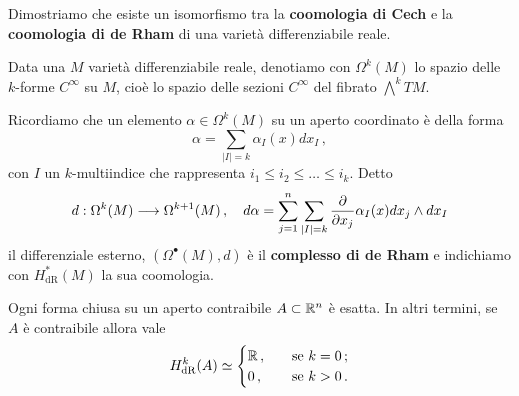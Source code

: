 \begin{ex}
	Dimostriamo che esiste un isomorfismo tra la \textbf{coomologia
	di Cech} e la \textbf{coomologia di de Rham}
	di una varietà differenziabile reale.
	
	\begin{df}
		Data una $M$ varietà differenziabile reale,
		denotiamo con $\Omega^{k}(M)$ lo spazio delle $k$-forme
		$C^{\infty}$ su $M$, cioè lo spazio delle sezioni $C^{\infty}$
		del fibrato $\bigwedge^{k} TM$.
	\end{df}
	
	Ricordiamo che un elemento
		$\alpha \in \Omega^{k}(M)$ su un aperto coordinato
		è della forma
		\begin{equation*}
			\alpha = \sum_{|I| = k} \alpha_{I}(x) dx_{I}\,,
		\end{equation*}
		con $I$ un $k$-multiindice che rappresenta $i_{1} \le i_{2} \le \dots \le i_{k}$.
		Detto 
		\begin{equation*}
			d : \Omega^{k}(M) \longrightarrow \Omega^{k+1}(M)\,,
			\quad d\alpha = \sum_{j=1}^{n}\sum_{|I|=k} \frac{\partial}{\partial x_{j}} \alpha_{I}(x) dx_{j} \wedge dx_{I}
		\end{equation*}
		il differenziale esterno, $(\Omega^{\bullet}(M),d)$ è il \textbf{complesso di de Rham}
		e indichiamo con $H^{*}_{\mathrm{dR}}(M)$ la sua coomologia.
	
	\begin{lemma*}[Poincarè]
		Ogni forma chiusa su un aperto contraibile $A \subset {\mathbb R}^{n}$ è esatta.
		In altri termini, se $A$ è contraibile allora vale
		\begin{equation*}
			H^{k}_{\mathrm{dR}}(A) \simeq
			\begin{cases}
				{\mathbb R}\,, \quad &\text{se } k=0\,;\\
				0\,, \quad &\text{se } k>0\,.
			\end{cases}
		\end{equation*}
	\end{lemma*}
		

\end{ex}
